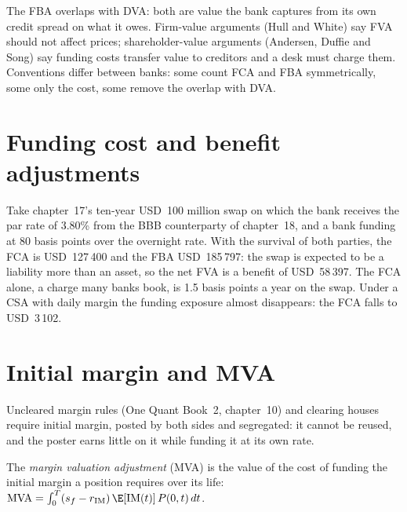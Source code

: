 The FBA overlaps with DVA: both are value the bank captures from its own credit spread
on what it owes. Firm-value arguments (Hull and White) say FVA should not affect prices;
shareholder-value arguments (Andersen, Duffie and Song) say funding costs transfer value
to creditors and a desk must charge them. Conventions differ between banks: some count
FCA and FBA symmetrically, some only the cost, some remove the overlap with DVA.

\section{Funding cost and benefit adjustments}

\begin{example}\label{ex:rc:funding-margin-and-capital-adjustments:fva}
Take chapter~17's ten-year USD~100 million swap on which the bank receives the par rate
of 3.80\% from the BBB counterparty of chapter~18, and a bank funding at 80 basis points
over the overnight rate. With the survival of both parties, the FCA is USD~127\,400 and the
FBA USD~185\,797: the swap is expected to be a liability more than an asset, so the net FVA
is a benefit of USD~58\,397. The FCA alone, a charge many banks book, is 1.5 basis points a
year on the swap. Under a CSA with daily margin the funding exposure almost disappears: the
FCA falls to USD~3\,102.
\end{example}

\label{lst:rc:funding-margin-and-capital-adjustments:fva}

\section{Initial margin and MVA}

Uncleared margin rules (One Quant Book~2, chapter~10) and clearing houses require
initial margin, posted by both sides and segregated: it cannot be reused, and the poster
earns little on it while funding it at its own rate.

\begin{definition}\label{def:rc:funding-margin-and-capital-adjustments:mva}
The \emph{margin valuation adjustment} (MVA) is the value
of the cost of funding the initial margin a position requires over its life:
$\mathrm{MVA} = \int_0^T(s_f-r_{\mathrm{IM}})\,\E[\mathrm{IM}(t)]\,P(0,t)\,dt$.
\end{definition}

